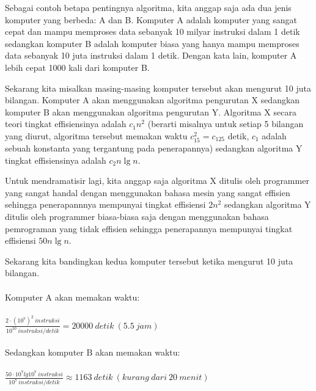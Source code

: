 Sebagai contoh betapa pentingnya algoritma, kita anggap saja ada dua jenis komputer yang berbeda: A dan B. Komputer A adalah komputer yang sangat cepat dan mampu memproses data sebanyak 10 milyar instruksi dalam 1 detik sedangkan komputer B adalah komputer biasa yang hanya mampu memproses data sebanyak 10 juta instruksi dalam 1 detik. Dengan kata lain, komputer A lebih cepat 1000 kali dari komputer B.

Sekarang kita misalkan masing-masing komputer tersebut akan mengurut 10 juta bilangan. Komputer A akan menggunakan algoritma pengurutan X sedangkan komputer B akan menggunakan algoritma pengurutan Y. Algoritma X secara teori tingkat effisiensinya adalah $c_1n^2$ (berarti misalnya untuk setiap 5 bilangan yang diurut, algoritma tersebut memakan waktu $c_15^2 = c_125$ detik, $c_1$ adalah sebuah konstanta yang tergantung pada penerapannya) sedangkan algoritma Y tingkat effisiensinya adalah $c_2n\lg n$. 

Untuk mendramatisir lagi, kita anggap saja algoritma X ditulis oleh programmer yang sangat handal dengan menggunakan bahasa mesin yang sangat effisien sehingga penerapannnya mempunyai tingkat effisiensi $2n^2$ sedangkan algoritma Y ditulis oleh programmer biasa-biasa saja dengan menggunakan bahasa pemrograman yang tidak effisien sehingga penerapannya mempunyai tingkat effisiensi $50n\lg n$.

Sekarang kita bandingkan kedua komputer tersebut ketika mengurut 10 juta bilangan. 
\hspace*{\fill}\\\hspace*{\fill}\\
Komputer A akan memakan waktu:
\hspace*{\fill}\\\hspace*{\fill}\\
$\frac{2\cdot(10^7)^2\ instruksi}{10^{10}\ instruksi/detik} = 20000\ detik\ (5.5\ jam)$
\hspace*{\fill}\\\hspace*{\fill}\\
Sedangkan komputer B akan memakan waktu:
\hspace*{\fill}\\\hspace*{\fill}\\
$\frac{50\cdot10^7lg10^7\ instruksi}{10^{7}\ instruksi/detik} \approx 1163\ detik\ (kurang\ dari\ 20\ menit)$
\hspace*{\fill}\\\hspace*{\fill}\\

